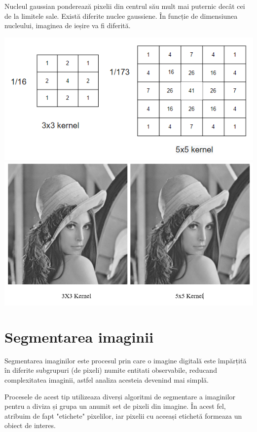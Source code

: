 \documentclass[10pt]{article}
\begin{document}
\> Nucleul gaussian ponderează pixelii din centrul său mult mai puternic decât cei de la limitele sale.
Există diferite nuclee gaussiene. În funcție de dimensiunea nucleului, imaginea de ieșire va fi diferită.

\begin{center}

  \includegraphics[scale=0.5]{filtru-gaussian-masca}
  \includegraphics[scale=0.5]{filtru-gaussian}

\end{center}


\section{Segmentarea imaginii}

\> Segmentarea imaginilor este procesul prin care o imagine digitală este împărțită în diferite subgrupuri (de pixeli)
numite entitati observabile, reducand complexitatea imaginii, astfel analiza acesteia devenind mai simplă.

\> Procesele de acest tip utilizeaza diverși algoritmi de segmentare a imaginilor pentru a diviza și grupa un anumit set de pixeli din imagine.
În acest fel, atribuim de fapt "etichete" pixelilor, iar pixelii cu aceeași etichetă formeaza un obiect de interes.
\end{document}
